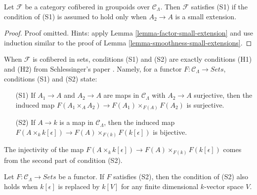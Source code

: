 \begin{lemma}
\label{lemma-S1-small-extensions}
Let $\mathcal{F}$ be a category cofibered in groupoids over $\mathcal 
C_\Lambda$. Then $\mathcal{F}$ satisfies (S1) if the condition of (S1)
is assumed to hold only when $A_2 \to A$ is a small extension.
\end{lemma}

\begin{proof}
Proof omitted. Hints: apply Lemma \ref{lemma-factor-small-extension}
and use induction similar to the proof of
Lemma \ref{lemma-smoothness-small-extensions}.
\end{proof}

\begin{remark}
\label{remark-compare-S1-S2-schlessinger}
When $\mathcal{F}$ is cofibered in sets, conditions (S1) and (S2) are exactly 
conditions (H1) and (H2) from Schlessinger's paper \cite{Sch}.
Namely, for a functor $F: \mathcal{C}_\Lambda \to 
\textit{Sets}$, conditions (S1) and (S2) state:
\begin{enumerate}
\item [(S1)] If $A_1 \to A$ and $A_2 \to A$ are maps in 
$\mathcal{C}_\Lambda$ with $A_2 \to A$ surjective, then the induced 
map $F(A_1 \times_{A} A_2) \to F(A_1) \times_{F(A)} F(A_2)$ is 
surjective.
\item [(S2)]  If $A \to k$ is a map in $\mathcal{C}_\Lambda$, then the 
induced map
$F(A \times_{k} k[\epsilon]) \to F(A) \times_{F(k)} F(k[\epsilon])$
is bijective.
\end{enumerate}
The injectivity of the map
$F(A \times_{k} k[\epsilon]) \to F(A) \times_{F(k)} F(k[\epsilon])$
comes from the second part of condition (S2).
\end{remark}

\begin{lemma}
\label{lemma-S2-extensions}
Let $F: \mathcal{C}_\Lambda \to \textit{Sets}$ be a functor.  If 
$F$ satisfies (S2), then the condition of (S2) also 
holds when $k[\epsilon]$ is replaced by $k[V]$ for any finite dimensional 
$k$-vector space $V$.
\end{lemma}

